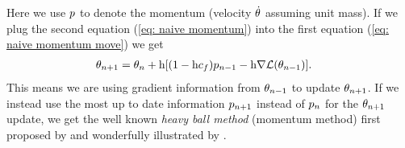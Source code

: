 %
Here we use \(p\) to denote the momentum (velocity \(\dot{\theta}\)
assuming unit mass).
If we plug the second equation (\ref{eq: naive momentum}) into the first
equation (\ref{eq: naive momentum move}) we get
%
\begin{align*}
	\theta_{n+1}
	&= \theta_n + \text{h} [(1-\text{h}c_f)p_{n-1} - \text{h}\nabla \mathcal{L}(\theta_{n-1})].
\end{align*}
%
This means we are using gradient information from \(\theta_{n-1}\) to update
\(\theta_{n+1}\). If we instead use the most up to date information
\(p_{n+1}\) instead of \(p_n\) for the \(\theta_{n+1}\) update,
we get the well known \emph{heavy ball method} (momentum method) first proposed
by \textcite{polyakMethodsSpeedingConvergence1964} and wonderfully illustrated
by \textcite{gohWhyMomentumReally2017}.

